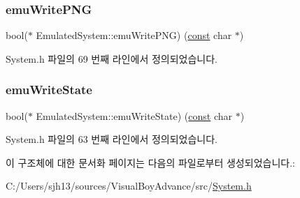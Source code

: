 \subsubsection{\texorpdfstring{emu\+Write\+P\+NG}{emuWritePNG}}
{\footnotesize\ttfamily bool($\ast$ Emulated\+System\+::emu\+Write\+P\+NG) (\mbox{\hyperlink{getopt1_8c_a2c212835823e3c54a8ab6d95c652660e}{const}} char $\ast$)}



System.\+h 파일의 69 번째 라인에서 정의되었습니다.

\mbox{\label{struct_emulated_system_a649c6ceaabee941f263a32fa8a73a9c5}} 
\subsubsection{\texorpdfstring{emu\+Write\+State}{emuWriteState}}
{\footnotesize\ttfamily bool($\ast$ Emulated\+System\+::emu\+Write\+State) (\mbox{\hyperlink{getopt1_8c_a2c212835823e3c54a8ab6d95c652660e}{const}} char $\ast$)}



System.\+h 파일의 63 번째 라인에서 정의되었습니다.



이 구조체에 대한 문서화 페이지는 다음의 파일로부터 생성되었습니다.\+:\begin{DoxyCompactItemize}
\item 
C\+:/\+Users/sjh13/sources/\+Visual\+Boy\+Advance/src/\mbox{\hyperlink{_system_8h}{System.\+h}}\end{DoxyCompactItemize}
